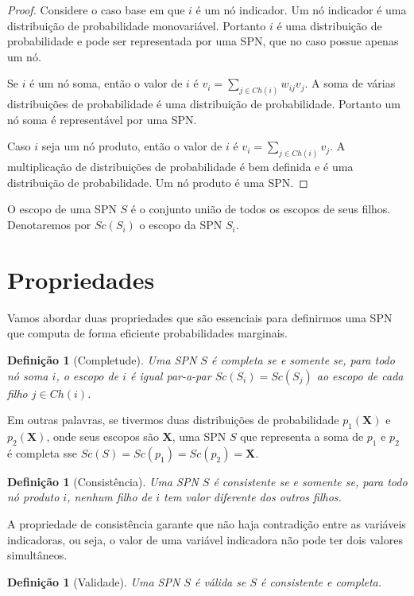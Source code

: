 \documentclass{amsart}
\theoremstyle{plain}
\newcounter{dummy-def}\numberwithin{dummy-def}{section}
\newtheorem{definition}[dummy-def]{Definição}
\newcounter{dummy-thm}\numberwithin{dummy-thm}{section}
\newcounter{dummy-prop}\numberwithin{dummy-prop}{section}
\newcounter{dummy-ex}\numberwithin{dummy-ex}{section}
\newcounter{dummy-eg}\numberwithin{dummy-eg}{section}
\numberwithin{equation}{section}
\newcommand{\set}[1]{\mathbf{#1}}
\begin{document}
\begin{proof}
  Considere o caso base em que $i$ é um nó indicador. Um nó indicador é uma distribuição de
  probabilidade monovariável. Portanto $i$ é uma distribuição de probabilidade e pode ser
  representada por uma SPN, que no caso possue apenas um nó.

  Se $i$ é um nó soma, então o valor de $i$ é $v_i=\sum_{j\in Ch(i)} w_{ij}v_j$. A soma de várias
  distribuições de probabilidade é uma distribuição de probabilidade. Portanto um nó soma é
  representável por uma SPN\@.

  Caso $i$ seja um nó produto, então o valor de $i$ é $v_i=\sum_{j\in Ch(i)} v_j$. A multiplicação
  de distribuições de probabilidade é bem definida e é uma distribuição de probabilidade. Um nó
  produto é uma SPN\@.
\end{proof}

O escopo de uma SPN $S$ é o conjunto união de todos os escopos de seus filhos. Denotaremos por
$Sc(S_i)$ o escopo da SPN $S_i$.

\section{Propriedades}

Vamos abordar duas propriedades que são essenciais para definirmos uma SPN que computa de forma
eficiente probabilidades marginais.

\begin{definition}[Completude]
  Uma SPN $S$ é completa se e somente se, para todo nó soma $i$, o escopo de $i$ é igual par-a-par
  $Sc(S_i)=Sc(S_j)$ ao escopo de cada filho $j\in Ch(i)$.
\end{definition}

Em outras palavras, se tivermos duas distribuições de probabilidade $p_1(\set{X})$ e
$p_2(\set{X})$, onde seus escopos são $\set{X}$, uma SPN $S$ que representa a soma de $p_1$ e $p_2$
é completa sse $Sc(S)=Sc(p_1)=Sc(p_2)=\set{X}$.

\begin{definition}[Consistência]
  Uma SPN $S$ é consistente se e somente se, para todo nó produto $i$, nenhum filho de $i$ tem
  valor diferente dos outros filhos.
\end{definition}

A propriedade de consistência garante que não haja contradição entre as variáveis indicadoras, ou
seja, o valor de uma variável indicadora não pode ter dois valores simultâneos.

\begin{definition}[Validade]
  Uma SPN $S$ é válida se $S$ é consistente e completa.
\end{definition}
\end{document}
